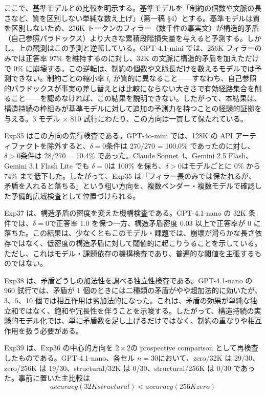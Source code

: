 \documentclass[12pt,a4paper]{article}
\begin{document}
ここで、基準モデルとの比較を明示する。基準モデルを「制約の個数や文脈の長さなど、質を区別しない単純な数え上げ」（第一稿 §4）とする。基準モデルは質を区別しないため、256K トークンのフィラー（数千件の事実文）が構造的矛盾（自己参照パラドックス）より大きな累積段階損失量を与えると予測する。しかし、上の観測はこの予測と逆転している。GPT-4.1-mini では、256K フィラーのみでは正答率 97\% を維持するのに対し、32K の文脈に構造的矛盾を加えただけで 0\% に崩壊する。この逆転は、制約の個数や文脈長だけを数えるモデルでは予測できない。制約ごとの縮小率 \(l_{i}\) が質的に異なること------すなわち、自己参照的パラドックスが事実の差し替えとは比較にならない大きさで有効経路集合を削ること------を認めなければ、この結果を説明できない。したがって、本結果は、構造持続の枠組みが基準モデルに対して追加の予測力を持つことの経験的証拠を与える。3 モデル × 810 試行にわたり、この方向は一貫して保たれている。

Exp35 はこの方向の先行検査である。GPT-4o-mini では、128K の API アーティファクトを除外すると、\(\delta=0\)条件は 270/270 = 100.0\% であったのに対し、\(\delta>0\)条件は 28/270 = 10.4\% であった。Claude Sonnet 4、Gemini 2.5 Flash、Gemini 3.1 Flash Lite でも \(\delta=0\)は 100\% を保ち、\(\delta>0\)はモデルごとに 0\% から 74\% まで低下した。したがって、Exp35 は「フィラー長のみでは保たれるが、矛盾を入れると落ちる」という粗い方向を、複数ベンダー・複数モデルで確認した予備的広域検査として位置づけられる。

Exp37 は、構造矛盾の密度を変えた機構検査である。GPT-4.1-nano の 32K 条件では、\(\delta=0\)で正答率 1.0 を保つ一方、構造矛盾密度 0.03 以上で正答率が 0 に落ちた。この結果は、少なくともこのモデル・課題では、崩壊が滑らかな長さ依存ではなく、低密度の構造矛盾に対して閾値的に起こりうることを示している。ただし、これはモデル・課題依存の機構検査であり、普遍的な閾値を主張するものではない。

Exp38 は、矛盾どうしの加法性を調べる独立性検査である。GPT-4.1-nano の 960 試行では、矛盾が 1 個のときには二種類の矛盾がやや超加法的に効いたが、3、5、10 個では相互作用は劣加法的になった。これは、矛盾の効果が単純な独立和ではなく、飽和や冗長性を伴うことを示唆する。したがって、構造持続の実験的モデル化では、単に矛盾数を足し上げるだけではなく、制約の重なりや相互作用を扱う必要がある。

Exp39 は、Exp36 の中心的方向を \(2\times2\)の prospective comparison として再検査したものである。GPT-4.1-nano、各セル \(n=30\)において、zero/32K は 29/30、zero/256K は 19/30、structural/32K は 0/30、structural/256K は 0/30 であった。事前に置いた主比較は \[
accuracy(32K structural) < accuracy(256K zero)
\]
\end{document}
